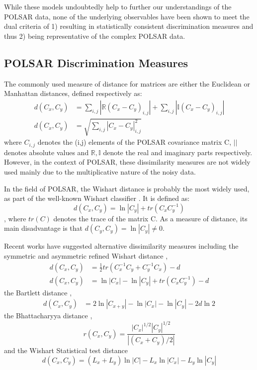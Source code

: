 \documentclass[journal]{IEEEtran}
\begin{document}
While these models undoubtedly help to further our understandings of the POLSAR data,
  none of the underlying observables have been shown to meet the dual criteria of
  1) resulting in statistically consistent discrimination measures and thus 
  2) being representative of the complex POLSAR data.

\subsection{POLSAR Discrimination Measures}
\label{sec:lit_measures}

The commonly used measure of distance for matrices are either the Euclidean or Manhattan distances, defined respectively as:
\begin{align}
  d(C_x,C_y) &= \sum_{i,j} |\mathbb{R} (C_x - C_y)_{i,j}| + \sum_{i,j} |\mathbb{I} (C_x - C_y)_{i,j}| \\
  d(C_x,C_y) &= \sqrt{\sum_{i,j} |C_x - C_y|_{i,j}^2 }
\end{align}
where $C_{i,j}$ denotes the (i,j) elements of the POLSAR covariance matrix C,
 $||$ denotes absolute values
and $\mathbb{R},\mathbb{I}$ denote the real and imaginary parts respectively.
However, in the context of POLSAR, %
  these dissimilarity measures are not widely used 
  mainly due to the multiplicative nature of the noisy data.

In the field of POLSAR, the Wishart distance is probably the most widely used, as part of the well-known Wishart classifier \cite{Lee_1999_TGRS}.
It is defined \cite{Lee_1994_IJRS_2299} as:
\begin{equation}
  d(C_x,C_y) = \ln|C_y| + tr(C_xC_y^{-1})
\end{equation},
where $tr(C)$ denotes the trace of the matrix C. 
As a measure of distance, its main disadvantage is that $d(C_y,C_y) = \ln|C_y| \neq 0$.

Recent works have suggested alternative dissimilarity measures including the symmetric and asymmetric refined Wishart distance \cite{Anfinsen_2007_ESA_POLINSAR},
\begin{align}
  d(C_x,C_y) &= \frac{1}{2} tr(C_x^{-1}C_y + C_y^{-1}C_x) - d \\
    d(C_x,C_y) &= \ln|C_x| - \ln|C_y| + tr(C_xC_y^{-1}) - d
\end{align}
the Bartlett distance \cite{Kersten_2005_TGRS_519},
  \begin{align}
  d(C_x,C_y) &= 2 \ln |C_{x+y}| - \ln |C_x| - \ln |C_y| - 2d\ln2
  \end{align}
the Bhattacharyya distance \cite{Lee_2011_IGARSS_3740},
\begin{equation}
  r(C_x,C_y) = \frac{|C_x|^{1/2} |C_y|^{1/2}}{|(C_x+C_y)/2|}
\end{equation}
and the Wishart Statistical test distance \cite{Cao_2007_TGRS_3454}
\begin{equation}
  d(C_x,C_y) = (L_x + L_y) \ln|C| - L_x \ln|C_x| - L_y\ln|C_y|
\end{equation}
\end{document}
